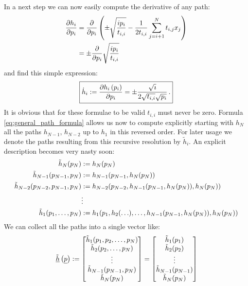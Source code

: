 \documentclass[a4paper,10pt]{article}
\begin{document}
In a next step we can now easily compute the derivative of any path:
\begin{equation}
\begin{split}
  \frac{\partial h_i}{\partial p_i}
  & = \frac{\partial }{\partial p_i}
      \left(\pm \sqrt{\frac{i p_i}{t_{i,i}}} -\frac{1}{2 t_{i,i}} \sum_{j=i+1}^{N} t_{i,j} x_j\right) \\
  & = \pm \frac{\partial }{\partial p_i} \sqrt{\frac{i p_i}{t_{i,i}}}
\end{split}
\end{equation}
and find this simple expression:
\begin{equation} \label{eq:general_path_derivative_formula}
\boxed{
  \dot{h}_i := \frac{\partial h_i\left(p_i\right)}{\partial p_i}
  = \pm \frac{\sqrt{\imath}}{2 \sqrt{t_{i,i}}\sqrt{p_i}} \,.
}
\end{equation}
It is obvious that for these formulae to be valid
$t_{i,i}$ must never be zero.
Formula \eqref{eq:general_path_formula} allows us now to compute explicitly
starting with $h_N$ all the paths $h_{N-1}$, $h_{N-2}$ up to $h_1$ in
this reversed order.
For later usage we denote the paths resulting from this
recursive resolution by $\tilde{h}_i$. An explicit description
becomes very nasty soon:
\begin{equation*}
\begin{split}
  \tilde{h}_N(p_N)
  & := h_N(p_N) \\
  \tilde{h}_{N-1}(p_{N-1}, p_N)
  & := h_{N-1}(p_{N-1},
                    h_N(p_N)
                   ) \\
  \tilde{h}_{N-2}(p_{N-2}, p_{N-1}, p_N)
  & := h_{N-2}(p_{N-2},
                    h_{N-1}(p_{N-1},
                      h_N(p_N)
                    ),
                    h_N(p_N)
                   ) \\
  & \vdots \\
  \tilde{h}_1(p_1, \ldots, p_N)
  & := h_1(p_1,
                h_2(\ldots),
                \ldots,
                h_{N-1}(p_{N-1}, h_N(p_N)),
                h_N(p_N)
               )
\end{split}
\end{equation*}
We can collect all the paths into a single vector like:
\begin{equation}
 \underline{\tilde{h}}\left(\underline{p}\right) :=
 \begin{bmatrix}
  \tilde{h}_1(p_1, p_2, \ldots, p_N) \\
  \tilde{h}_2(p_2, \ldots, p_N) \\
  \vdots \\
  \tilde{h}_{N-1}(p_{N-1}, p_N) \\
  \tilde{h}_{N}(p_N) \\
 \end{bmatrix}
 =
 \begin{bmatrix}
  \tilde{h}_1(p_1) \\
  \tilde{h}_2(p_2) \\
  \vdots \\
  \tilde{h}_{N-1}(p_{N-1}) \\
  \tilde{h}_{N}(p_N) \\
 \end{bmatrix}
\end{equation}
\end{document}
